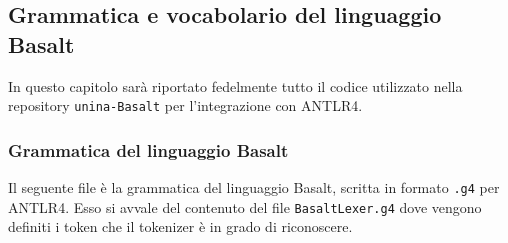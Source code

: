 \subsection{Grammatica e vocabolario del linguaggio Basalt}
In questo capitolo sarà riportato fedelmente tutto il codice utilizzato nella repository \texttt{unina-Basalt} 
per l'integrazione con ANTLR4. \\

\subsubsection{Grammatica del linguaggio Basalt}
Il seguente file è la grammatica del linguaggio Basalt, scritta in formato \texttt{.g4} per ANTLR4. Esso 
si avvale del contenuto del file \texttt{BasaltLexer.g4} dove vengono definiti i token che il tokenizer
è in grado di riconoscere. \\

